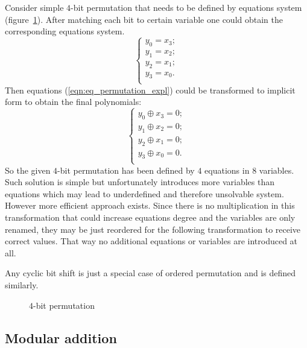 Consider simple $4$-bit permutation that needs to be defined by equations
system (figure~\ref{fig:eq_permutation}). After matching each bit to certain
variable one could obtain the corresponding equations system.
\begin{equation}
\label{eqn:eq_permutation_expl}
\left\{
	\begin{array}{ll}
        y_0 = x_3; \\
        y_1 = x_2; \\
        y_2 = x_1; \\
        y_3 = x_0. \\
	\end{array} \right.
\end{equation}
Then equations (\ref{eqn:eq_permutation_expl}) could be transformed to implicit
form to obtain the final polynomials:
\begin{equation}
\label{eqn:eq_permutation_impl}
\left\{
	\begin{array}{ll}
        y_0 \oplus x_3 = 0; \\
        y_1 \oplus x_2 = 0; \\
        y_2 \oplus x_1 = 0; \\
        y_3 \oplus x_0 = 0. \\
	\end{array} \right.
\end{equation}
So the given $4$-bit permutation has been defined by $4$ equations in $8$
variables.  Such solution is simple but unfortunately introduces more variables
than equations which may lead to underdefined and therefore unsolvable system.
However more efficient approach exists. Since there is no multiplication in this
transformation that could increase equations degree and the variables are only
renamed, they may be just reordered for the following transformation to receive
correct values. That way no additional equations or variables are introduced at
all.

Any cyclic bit shift is just a special case of ordered permutation and is
defined similarly.

\begin{figure}[htbp]
	\centering
    
	\caption{$4$-bit permutation}
	\label{fig:eq_permutation}
\end{figure}

\subsection{Modular addition}
\label{seq:key-add-eqn}

